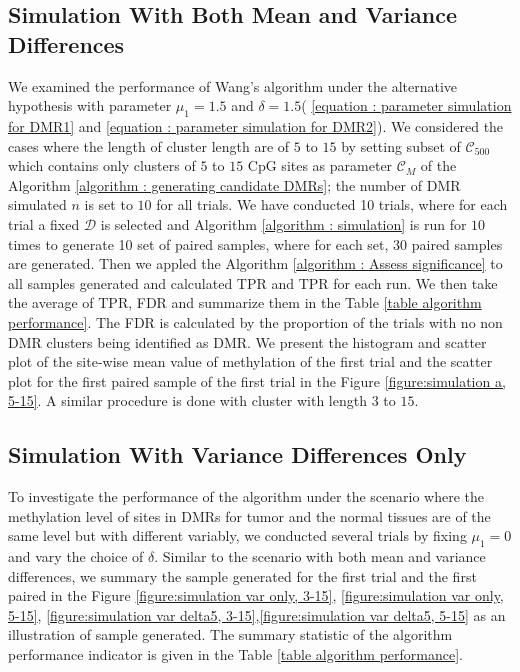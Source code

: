 \documentclass{report}
\begin{document}
\subsection{Simulation With Both Mean and Variance Differences}

\par
We examined the performance of Wang's algorithm under the alternative hypothesis
with parameter $\mu_1 =1.5$ and $\delta =1.5$( \eqref{equation : parameter simulation for DMR1} and \eqref{equation : parameter simulation for DMR2}).
 We considered the cases where the length of cluster length are of $5$ to $15$ by setting subset of $\mathcal{C}_{500}$ which contains only clusters of $5$ to $15$ CpG sites as
parameter $\mathcal{C}_M$ of the Algorithm \ref{algorithm : generating candidate DMRs}; the number of DMR simulated $n$ is set to $10$ for all trials. We have conducted 10 trials, where for each trial a fixed $\mathcal{D}$ is selected and 
Algorithm \ref{algorithm : simulation} is run for $10$ times to generate 10 set of paired samples, where for each set, $30$ paired samples are generated.
Then we appled the Algorithm \ref{algorithm : Assess significance} to all samples generated and calculated TPR and TPR for each run. We then take the average of TPR, FDR and summarize them in the Table \ref{table algorithm performance}. The FDR is calculated by the proportion of the trials with no non DMR clusters being identified as DMR.
We present the histogram and scatter plot of the site-wise mean value of methylation of the first trial and the scatter plot for the first paired sample of the first trial
in the Figure \ref{figure:simulation a, 5-15}. A similar procedure is done with cluster with length $3$ to $15$.
\subsection{Simulation With Variance Differences Only}
\par
 To investigate the performance of the algorithm under the scenario where the methylation
 level of sites in DMRs for tumor and the normal tissues are of the same level but with different variably, 
 we conducted several trials by fixing $\mu_1 =0$ and vary the choice of $\delta$. Similar to the scenario with both mean and variance differences, we summary the sample generated for the first trial and the first paired in the Figure \ref{figure:simulation var only, 3-15}, \ref{figure:simulation var only, 5-15}, \ref{figure:simulation var delta5, 3-15},\ref{figure:simulation var delta5, 5-15} as an illustration of sample generated. The summary statistic of the algorithm performance indicator is given in the
 Table \ref{table algorithm performance}.
\end{document}
